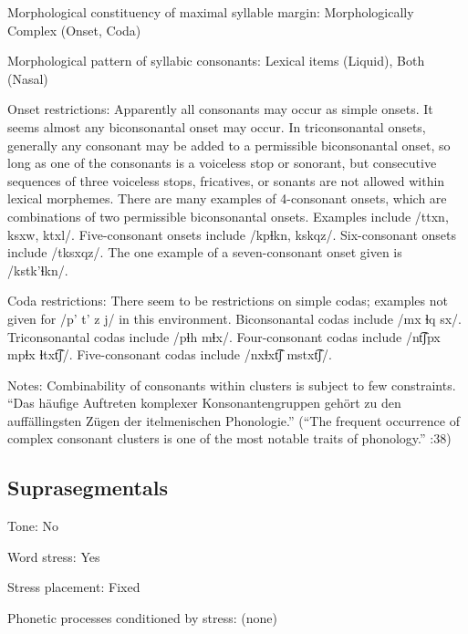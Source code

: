 {\begin{appendixdesc}
\item[Morphological constituency of maximal syllable margin:] Morphologically Complex (Onset, Coda)

\item[Morphological pattern of syllabic consonants:] Lexical items (Liquid), Both (Nasal)

\item[Onset restrictions:] Apparently all consonants may occur as simple onsets. It seems almost any biconsonantal onset may occur. In triconsonantal onsets, generally any consonant may be added to a permissible biconsonantal onset, so long as one of the consonants is a voiceless stop or sonorant, but consecutive sequences of three voiceless stops, fricatives, or sonants are not allowed within lexical morphemes. There are many examples of 4-consonant onsets, which are combinations of two permissible biconsonantal onsets. Examples include /ttxn, ksxw, ktxl/. Five-consonant onsets include /kpɬkn, kskqz/. Six-consonant onsets include /tksxqz/. The one example of a seven-consonant onset given is /kstk’ɬkn/.

\item[Coda restrictions:] There seem to be restrictions on simple codas; examples not given for /p’ t’ z j/ in this environment. Biconsonantal codas include /mx ɬq sx/. Triconsonantal codas include /pɬh mɬx/. Four-consonant codas include /nt͡ʃpx mpɬx ɬtxt͡ʃ/. Five-consonant codas include /nxɬxt͡ʃ mstxt͡ʃ/.

\item[Notes:] Combinability of consonants within clusters is subject to few constraints. “Das häufige Auftreten komplexer Konsonantengruppen gehört zu den auffällingsten Zügen der itelmenischen Phonologie.” (“The frequent occurrence of complex consonant clusters is one of the most notable traits of  phonology.” \citealt{GeorgVolodin1999}:38)
\end{appendixdesc}
\subsection*{Suprasegmentals}
\begin{appendixdesc}
\item[Tone:] No

\item[Word stress:] Yes

\item[Stress placement:] Fixed

\item[Phonetic processes conditioned by stress:] (none)


\end{appendixdesc}}
